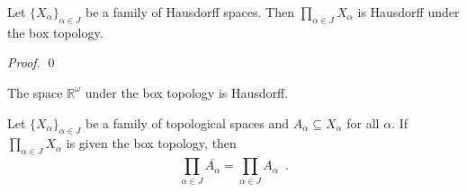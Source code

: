 \begin{thm}
  Let $\{ X_\alpha \}_{\alpha \in J}$ be a family of Hausdorff spaces. Then
  $\prod_{\alpha \in J} X_\alpha$ is Hausdorff under the box topology.
\end{thm}

\begin{proof}
  \pf
  \qed
\end{proof}

\begin{cor}
  The space $\mathbb{R}^\omega$ under the box topology is Hausdorff.
\end{cor}

\begin{thm}[AC]
  Let $\{ X_\alpha \}_{\alpha \in J}$ be a family of topological spaces and
  $A_\alpha \subseteq X_\alpha$ for all $\alpha$. If $\prod_{\alpha \in J}
  X_\alpha$ is given the box topology, then
  \[ \prod_{\alpha \in J} \overline{A_\alpha} = \overline{\prod_{\alpha \in
      J}
    A_\alpha} \enspace . \]
\end{thm}

